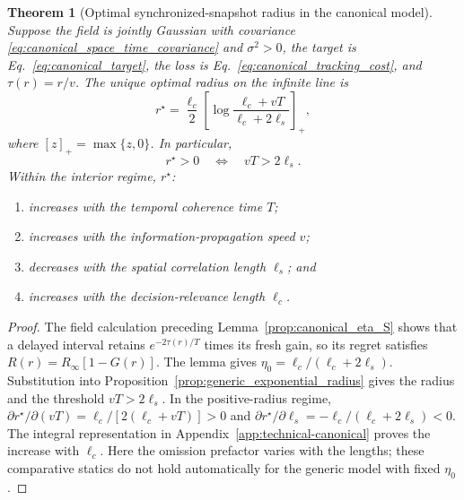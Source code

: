 \documentclass[11pt]{article}
\newtheorem{theorem}{Theorem}
\begin{document}
\begin{samepage}
\begin{theorem}[Optimal synchronized-snapshot radius in the canonical model]
\label{thm:canonical_optimal_radius}
Suppose the field is jointly Gaussian with covariance
\eqref{eq:canonical_space_time_covariance} and $\sigma^2>0$,
the target is Eq.~\eqref{eq:canonical_target}, the loss is
Eq.~\eqref{eq:canonical_tracking_cost}, and $\tau(r)=r/v$.
The unique optimal radius on the infinite line is
\begin{equation}
\boxed{r^\star=\frac{\ell_c}{2}
\left[\log\frac{\ell_c+vT}{\ell_c+2\ell_s}\right]_+,}
\label{eq:canonical_optimal_radius}
\end{equation}
where $[z]_+=\max\{z,0\}$. In particular,
\begin{equation}
r^\star>0\quad\Longleftrightarrow\quad vT>2\ell_s.
\label{eq:positive_radius_condition}
\end{equation}
Within the interior regime, $r^\star$:
\begin{enumerate}
    \item increases with the temporal coherence time $T$;
    \item increases with the information-propagation speed $v$;
    \item decreases with the spatial correlation length $\ell_s$; and
    \item increases with the decision-relevance length $\ell_c$.
\end{enumerate}
\end{theorem}
\end{samepage}

\begin{proof}
The field calculation preceding Lemma~\ref{prop:canonical_eta_S} shows
that a delayed interval retains $e^{-2\tau(r)/T}$ times its fresh gain,
so its regret satisfies $R(r)=R_\infty[1-G(r)]$. The lemma gives
$\eta_0=\ell_c/(\ell_c+2\ell_s)$. Substitution into
Proposition~\ref{prop:generic_exponential_radius} gives the radius and
the threshold $vT>2\ell_s$. In the positive-radius regime,
$\partial r^\star/\partial(vT)=\ell_c/[2(\ell_c+vT)]>0$ and
$\partial r^\star/\partial\ell_s=-\ell_c/(\ell_c+2\ell_s)<0$.
The integral representation in Appendix~\ref{app:technical-canonical}
proves the increase with $\ell_c$. Here the omission prefactor varies with
the lengths; these comparative statics do not hold automatically for the
generic model with fixed $\eta_0$.
\end{proof}
\end{document}
